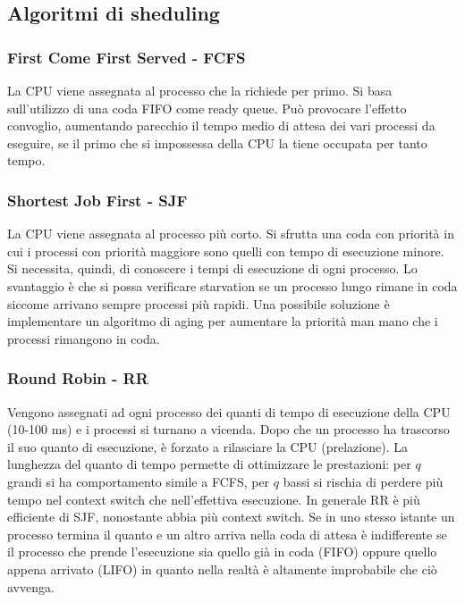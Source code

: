 \documentclass[a4paper]{article}
\begin{document}
\newpage


\subsection{Algoritmi di sheduling}
\subsubsection*{First Come First Served - FCFS}
La CPU viene assegnata al processo che la richiede per primo. Si basa sull'utilizzo di una coda FIFO come ready queue. Può
provocare l'effetto convoglio, aumentando parecchio il tempo medio di attesa dei vari processi da eseguire, se il primo che si
impossessa della CPU la tiene occupata per tanto tempo.

\subsubsection*{Shortest Job First - SJF}
La CPU viene assegnata al processo più corto. Si sfrutta una coda con priorità in cui i processi con priorità maggiore sono quelli
con tempo di esecuzione minore. Si necessita, quindi, di conoscere i tempi di esecuzione di ogni processo. Lo svantaggio è che si
possa verificare starvation se un processo lungo rimane in coda siccome arrivano sempre processi più rapidi. Una possibile soluzione
è implementare un algoritmo di aging per aumentare la priorità man mano che i processi rimangono in coda.

\subsubsection*{Round Robin - RR}
Vengono assegnati ad ogni processo dei quanti di tempo di esecuzione della CPU (10-100 ms) e i processi si turnano a vicenda.
Dopo che un processo ha trascorso il suo quanto di esecuzione, è forzato a rilasciare la CPU (prelazione). La lunghezza del
quanto di tempo permette di ottimizzare le prestazioni: per \(q\) grandi si ha comportamento simile a FCFS, per \(q\) bassi
si rischia di perdere più tempo nel context switch che nell'effettiva esecuzione. In generale RR è più efficiente di SJF,
nonostante abbia più context switch. Se in uno stesso istante un processo termina il quanto e un altro arriva nella coda di
attesa è indifferente se il processo che prende l'esecuzione sia quello già in coda (FIFO) oppure quello appena arrivato (LIFO)
in quanto nella realtà è altamente improbabile che ciò avvenga.
\end{document}
